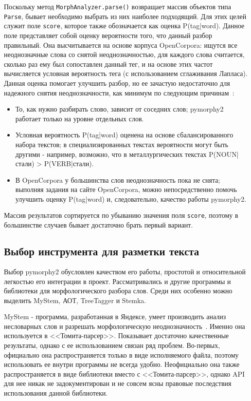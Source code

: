 Поскольку метод \lstinline{MorphAnalyzer.parse()} возвращает массив объектов типа \lstinline{Parse}, бывает необходимо выбрать из них наиболее подходящий. Для этих целей служит поле \lstinline{score}, которое также обозначается как оценка P(tag|word). Данное поле представляет собой оценку вероятности того, что данный разбор правильный. Она высчитывается на основе корпуса OpenCorpora: ищутся все неоднозначные слова со снятой неоднозначностью, для каждого слова считается, сколько раз ему был сопоставлен данный тег, и на основе этих частот вычисляется условная вероятность тега (с использованием сглаживания Лапласа). Данная оценка помогает улучшить разбор, но ее зачастую недостаточно для надежного снятия неоднозначности, как минимум по следующим причинам~\autocite{pymorphy2-guide}:
\begin{itemize}
  \item То, как нужно разбирать слово, зависит от соседних слов; pymorphy2 работает только на уровне отдельных слов.
  \item Условная вероятность P(tag|word) оценена на основе сбалансированного набора текстов; в специализированных текстах вероятности могут быть другими - например, возможно, что в металлургических текстах P(NOUN|стали) > P(VERB|стали).
  \item В OpenCorpora у большинства слов неоднозначность пока не снята; выполняя задания на сайте OpenCorpora, можно непосредственно помочь улучшить оценку P(tag|word) и, следовательно, качество работы pymorphy2.
\end{itemize}
Массив результатов сортируется по убыванию значения поля \lstinline{score}, поэтому в большинстве случаев бывает достаточно брать первый вариант.

\subsection{Выбор инструмента для разметки текста}
Выбор pymorphy2 обусловлен качеством его работы, простотой и относительной легкостью его интеграции в проект. Рассматривались и другие программы и библиотеки для морфологического разбора слов. Среди них особенно можно выделить MyStem, АОТ, TreeTagger и Stemka. 

MyStem - программа, разработанная в Яндексе, умеет производить анализ несловарных слов и разрешать морфологическую неоднозначность~\autocite{mystem}. Именно она используется в <<Томита-парсер>>. Показывает достаточно качественные результаты, однако с ее использованием связан ряд проблем. Во-первых, официально она распространяется только в виде исполняемого файла, поэтому использовать ее внутри программы не всегда удобно. Неофициально она также распространяется в виде библиотеки вместо с <<Томита-парсер>>, однако API для нее никак не задокументирован и не совсем ясны правовые последствия использования данной библиотеки.

